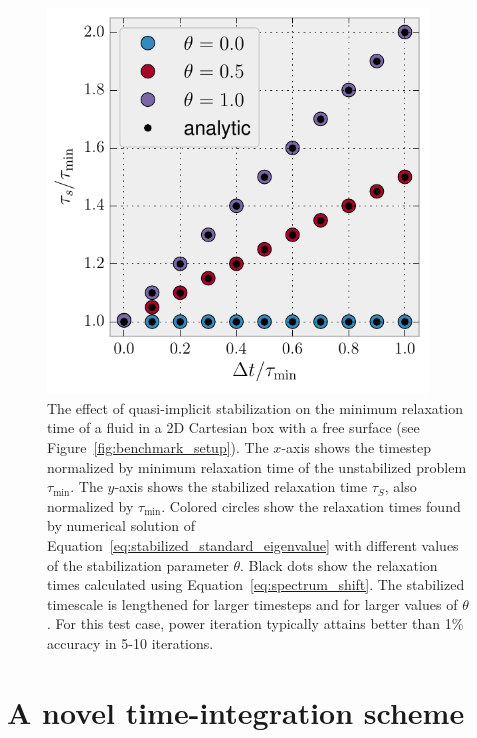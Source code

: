 \documentclass[preprint,12pt,authoryear]{elsarticle}
\begin{document}
\begin{figure}
\includegraphics[width=0.9\textwidth]{figures/perturb_spectrum.pdf}
\caption{The effect of quasi-implicit stabilization on the minimum relaxation time of a fluid in a 2D Cartesian box with a free surface (see Figure~\ref{fig:benchmark_setup}). The $x$-axis shows the timestep normalized by minimum relaxation time of the unstabilized problem $\tau_\mathrm{\min}$. The $y$-axis shows the stabilized relaxation time $\tau_S$, also normalized by $\tau_\mathrm{min}$. Colored circles show the relaxation times found by numerical solution of Equation~\eqref{eq:stabilized_standard_eigenvalue} with different values of the stabilization parameter $\theta$. Black dots show the relaxation times calculated using Equation~\eqref{eq:spectrum_shift}. The stabilized timescale is lengthened for larger timesteps and for larger values of $\theta$. For this test case, power iteration typically attains better than 1\% accuracy in 5-10 iterations.}
\label{fig:perturb_spectrum}
\end{figure}

\section{A novel time-integration scheme}
\label{sec:newscheme}
\end{document}
